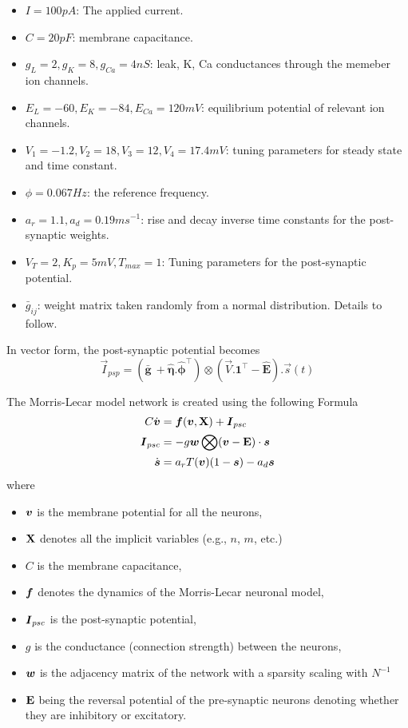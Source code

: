 \documentclass[12pt, letter]{article}
\begin{document}
	\begin{itemize}
		\item $I = 100 pA$: The applied current.
		\item $C = 20 pF$: membrane capacitance.
		\item $g_L = 2, g_K = 8, g_{Ca} = 4 nS$: leak, K, Ca conductances through the memeber ion channels.
		\item $E_L = -60, E_K = -84, E_{Ca} = 120 mV$: equilibrium potential of relevant ion channels.
		\item $V_1=-1.2, V_2 = 18, V_3 = 12, V_4 = 17.4 mV$: tuning parameters for steady state and time constant.
		\item $\phi = 0.067 Hz$: the reference frequency.
		\item $a_r = 1.1, a_d = 0.19 ms^{-1}$: rise and decay inverse time constants for the post-synaptic weights.
		\item $V_T = 2, K_p = 5 mV, T_{max} = 1$: Tuning parameters for the post-synaptic potential.
		\item $\bar{g}_{ij}$: weight matrix taken randomly from a normal distribution. Details to follow.
	\end{itemize}
	
	In vector form, the post-synaptic potential becomes
	\begin{equation}
		\vec{I}_{psp} = \left(\mathbf{\bar{g}}\ + \mathbf{\hat{\eta}}.\mathbf{\hat{\phi}}^\intercal\right) \otimes (\vec{V}.\mathbf{1}^\intercal - \mathbf{\hat{E}}).\vec{s}(t)
	\end{equation}

	\pagebreak

	The Morris-Lecar model network is created using the following Formula
	\begin{equation}    \label{eq:morris-lecar}
	\begin{aligned}
		C \dot{\vb*{v}} &= \vb*{f}(\vb*{v}, \vb{X}) + \vb*{I}_{psc}\\
		\vb*{I}_{psc} &= - g \vb*{w} \bigotimes (\vb*{v} - \vb{E}) \cdot \vb*{s}  \\
		\dot{\vb*{s}} &= a_r T(\vb*{v}) (1 - \vb*{s}) - a_d \vb*{s}
	\end{aligned}
	\end{equation}
	where 
	\begin{itemize}
		\item $\vb*{v}$ is the membrane potential for all the neurons,
		\item $\vb{X}$ denotes all the implicit variables (e.g., $n$, $m$, etc.)
		\item  $C$ is the membrane capacitance,
		\item $\vb*{f}$ denotes the dynamics of the Morris-Lecar neuronal model,
		\item $\vb*{I}_{psc}$ is the post-synaptic potential,
		\item $g$ is the conductance (connection strength) between the neurons,
		\item $\vb*{w}$ is the adjacency matrix of the network with a sparsity scaling with $N^{-1}$
		\item $\vb{E}$ being the reversal potential of the pre-synaptic neurons denoting whether they are inhibitory or excitatory.
	\end{itemize}
	
\end{document}
